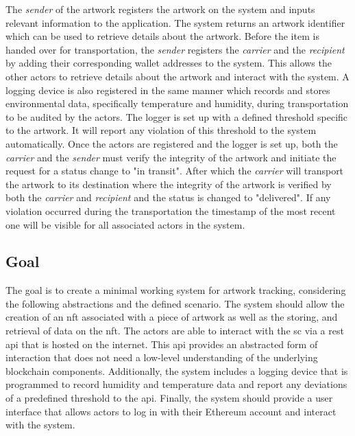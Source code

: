 The \textit{sender} of the artwork registers the artwork on the system and inputs relevant information to the application. The system returns an artwork identifier which can be used to retrieve details about the artwork. Before the item is handed over for transportation, the \textit{sender} registers the \textit{carrier} and the \textit{recipient} by adding their corresponding wallet addresses to the system. This allows the other actors to retrieve details about the artwork and interact with the system. A logging device is also registered in the same manner which records and stores environmental data, specifically temperature and humidity, during transportation to be audited by the actors. The logger is set up with a defined threshold specific to the artwork. It will report any violation of this threshold to the system automatically. Once the actors are registered and the logger is set up, both the \textit{carrier} and the \textit{sender} must verify the integrity of the artwork and initiate the request for a status change to "in transit". After which the \textit{carrier} will transport the artwork to its destination where the integrity of the artwork is verified by both the \textit{carrier} and \textit{recipient} and the status is changed to "delivered". If any violation occurred during the transportation the timestamp of the most recent one will be visible for all associated actors in the system.

\subsection*{Goal}
The goal is to create a minimal working system for artwork tracking, considering the following abstractions and the defined scenario. The system should allow the creation of an \gls{nft} associated with a piece of artwork as well as the storing, and retrieval of data on the \gls{nft}. The actors are able to interact with the \gls{sc} via a \gls{rest} \gls{api} that is hosted on the internet. This \gls{api} provides an abstracted form of interaction that does not need a low-level understanding of the underlying blockchain components. Additionally, the system includes a logging device that is programmed to record humidity and temperature data and report any deviations of a predefined threshold to the \gls{api}. Finally, the system should provide a user interface that allows actors to log in with their Ethereum account and interact with the system.

